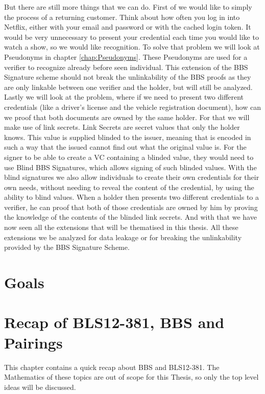 \documentclass[
	a4paper               %
	,bibliography=totoc   %
	,listof=totoc         %
	,monolingual
	twoside=false,
]{bfhthesis}              %
\begin{document}
But there are still more things that we can do.
First of we would like to simply the process of a returning customer.
Think about how often you log in into Netflix, either with your email and password or with the cached login token.
It would be very unnecessary to present your credential each time you would like to watch a show, so we would like recognition.
To solve that problem we will look at Pseudonyms\cite{pseudonyms} in chapter \ref{chap:Pseudonyms}.
These Pseudonyms are used for a verifier to recognize already before seen individual.
This extension of the BBS Signature scheme should not break the unlinkability of the BBS proofs as they are only linkable between one verifier and the holder, but will still be analyzed.
Lastly we will look at the problem, where if we need to present two different credentials (like a driver's license and the vehicle registration document), how can we proof that both documents are owned by the same holder.
For that we will make use of link secrets\cite{linksecrets}.
Link Secrets are secret values that only the holder knows.
This value is supplied blinded to the issuer, meaning that is encoded in such a way that the issued cannot find out what the original value is.
For the signer to be able to create a VC containing a blinded value, they would need to use Blind BBS Signatures\cite{bbs-signature-scheme}, which allows signing of such blinded values.
With the blind signatures we also allow individuals to create their own credentials for their own needs, without needing to reveal the content of the credential, by using the ability to blind values.
When a holder then presents two different credentials to a verifier, he can proof that both of those credentials are owned by him by proving the knowledge of the contents of the blinded link secrets.
And with that we have now seen all the extensions that will be thematised in this thesis.
All these extensions we be analyzed for data leakage or for breaking the unlinkability provided by the BBS Signature Scheme.

\chapter{Goals}

\chapter{Recap of BLS12-381, BBS and Pairings}
This chapter contains a quick recap about BBS and BLS12-381.
The Mathematics of these topics are out of scope for this Thesis, so only the top level ideas will be discussed.
\end{document}
